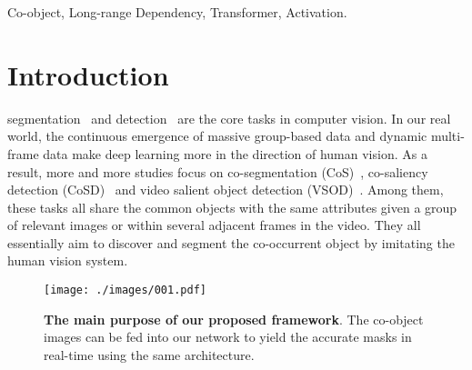 \documentclass[journal]{IEEEtran}
\begin{document}
\begin{IEEEkeywords}
Co-object, Long-range Dependency, Transformer, Activation.
\end{IEEEkeywords}



\IEEEpeerreviewmaketitle


\section{Introduction}
 segmentation~\cite{chen2017deeplab,chen2018encoder,su2021context} and detection~\cite{bochkovskiy2020yolov4,law2018cornernet} are the core tasks in computer vision. 
In our real world, the continuous emergence of massive group-based data and dynamic multi-frame data make deep learning more in the direction of human vision.
As a result, more and more studies focus on co-segmentation (CoS)~\cite{zhang2020deep,zhang2021cyclesegnet}, co-saliency detection (CoSD)~\cite{zhang2021deepacg,fan2021group} and video salient object detection (VSOD)~\cite{gu2020pyramid,ji2021full}.
Among them, these tasks all share the common objects with the same attributes given a group of relevant images or within several adjacent frames in the video. They all essentially aim to discover and segment the co-occurrent object by imitating the human vision system. 

\begin{figure}
	\begin{center}
		\centering
		\texttt{[image: ./images/001.pdf]}
	\end{center}
	\caption{\textbf{The main purpose of our proposed framework}. The co-object images can be fed into our network to yield the accurate masks in real-time using the same architecture.}
	\label{fig1}
	\vspace{-8pt}
\end{figure}
\end{document}
